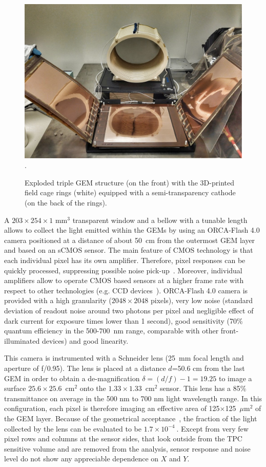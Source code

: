 \documentclass[review]{elsarticle}
\begin{document}
\begin{figure}[!ht]
\centering
\includegraphics[scale=0.290]{Fig1-gem.pdf}\DeclareGraphicsExtensions.
\caption{Exploded triple GEM structure (on the front)  with  the 3D-printed field cage rings (white)  equipped with a semi-transparency cathode (on the back of the rings).}
\label{fig:gem}
\end{figure}

A $203\times254\times1$ mm$^3$ transparent window 
and a  bellow with a tunable length allows  to collect the light emitted within the GEMs by using an ORCA-Flash 4.0 camera \cite{ORCAcamera} positioned  at a distance of about 50~cm from the outermost  GEM layer and based on an sCMOS sensor. The main feature of CMOS technology is that each individual pixel has its own amplifier. Therefore, pixel responses can be quickly processed, suppressing possible noise pick-up~\cite{bib:cmos}. Moreover, individual amplifiers allow to operate CMOS based sensors at a higher frame rate with respect to other technologies (e.g. CCD devices~\cite{bib:ccd}). 
ORCA-Flash 4.0 camera is provided with a high granularity ($2048\times2048$ pixels), very low noise (standard deviation of readout noise around two photons per pixel and negligible effect of dark current for exposure times lower than 1 second), good sensitivity (70\% quantum efficiency in the 500-700~nm range, comparable with other front-illuminated devices) and good linearity. 

This camera is instrumented with a Schneider lens (25~mm focal length and aperture of f/0.95). The lens is placed at a distance $d$=50.6 cm from the last GEM
in order to obtain a de-magnification
$\delta = (d/f) - 1 = 19.25$ to
image a surface $25.6 \times 25.6$~cm$^2$ onto the
$1.33 \times 1.33$~cm$^2$ sensor. This lens has a 85\%  transmittance on average in the 500 nm to 700 nm light wavelength range.
In this configuration, each pixel
 is therefore imaging  an effective area of 125$\times$125~$\mu$m$^2$ of the GEM layer. Because of the geometrical acceptance~\cite{bib:jinst_orange1}, the fraction of the light collected by the lens can be evaluated to be $1.7 \times 10^{-4}~$. Except from very few pixel rows and columns at the sensor sides, that look outside from the TPC sensitive volume and are removed from the analysis, sensor response and noise level do not show any appreciable dependence on $X$ and $Y$. 
\end{document}
